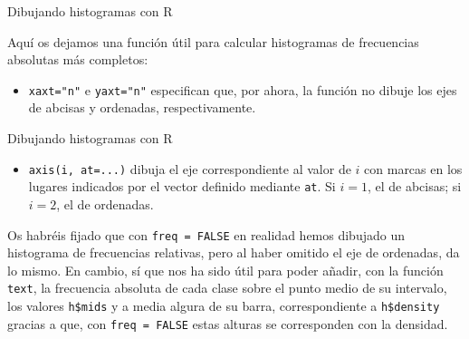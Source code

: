 \documentclass[
  ignorenonframetext,
]{beamer}
\newenvironment{Shaded}{\begin{snugshade}}{\end{snugshade}}
\newcommand{\ControlFlowTok}[1]{\textcolor[rgb]{0.13,0.29,0.53}{\textbf{#1}}}
\newcommand{\DataTypeTok}[1]{\textcolor[rgb]{0.13,0.29,0.53}{#1}}
\newcommand{\DecValTok}[1]{\textcolor[rgb]{0.00,0.00,0.81}{#1}}
\newcommand{\KeywordTok}[1]{\textcolor[rgb]{0.13,0.29,0.53}{\textbf{#1}}}
\newcommand{\NormalTok}[1]{#1}
\newcommand{\OperatorTok}[1]{\textcolor[rgb]{0.81,0.36,0.00}{\textbf{#1}}}
\newcommand{\OtherTok}[1]{\textcolor[rgb]{0.56,0.35,0.01}{#1}}
\newcommand{\StringTok}[1]{\textcolor[rgb]{0.31,0.60,0.02}{#1}}
\providecommand{\tightlist}{%
  \setlength{\itemsep}{0pt}\setlength{\parskip}{0pt}}
\begin{document}
\begin{frame}[fragile]{Dibujando histogramas con R}
\protect\hypertarget{dibujando-histogramas-con-r-3}{}

Aquí os dejamos una función útil para calcular histogramas de
frecuencias absolutas más completos:

\begin{Shaded}
\end{Shaded}

\begin{itemize}
\tightlist
\item
  \texttt{xaxt="n"} e \texttt{yaxt="n"} especifican que, por ahora, la
  función no dibuje los ejes de abcisas y ordenadas, respectivamente.
\end{itemize}

\end{frame}

\begin{frame}[fragile]{Dibujando histogramas con R}
\protect\hypertarget{dibujando-histogramas-con-r-4}{}

\begin{itemize}
\tightlist
\item
  \texttt{axis(i,\ at=...)} dibuja el eje correspondiente al valor de
  \(i\) con marcas en los lugares indicados por el vector definido
  mediante \texttt{at}. Si \(i=1\), el de abcisas; si \(i=2\), el de
  ordenadas.
\end{itemize}

Os habréis fijado que con \texttt{freq\ =\ FALSE} en realidad hemos
dibujado un histograma de frecuencias relativas, pero al haber omitido
el eje de ordenadas, da lo mismo. En cambio, sí que nos ha sido útil
para poder añadir, con la función \texttt{text}, la frecuencia absoluta
de cada clase sobre el punto medio de su intervalo, los valores
\texttt{h\$mids} y a media algura de su barra, correspondiente a
\texttt{h\$density} gracias a que, con \texttt{freq\ =\ FALSE} estas
alturas se corresponden con la densidad.

\end{frame}
\end{document}
